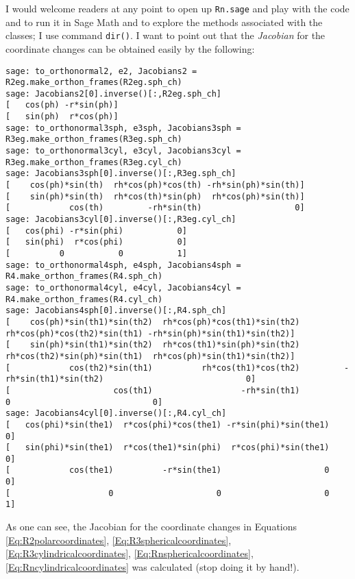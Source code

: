 \documentclass[10pt, twoside]{amsart}
\begin{document}
\begin{multicols*}{2}
I would welcome readers at any point to open up \verb|Rn.sage| and play with the code and to run it in Sage Math and to explore the methods associated with the classes; I use command \verb|dir()|.  I want to point out that the \emph{Jacobian} for the coordinate changes can be obtained easily by the following:
\begin{lstlisting}
sage: to_orthonormal2, e2, Jacobians2 = R2eg.make_orthon_frames(R2eg.sph_ch)
sage: Jacobians2[0].inverse()[:,R2eg.sph_ch]
[   cos(ph) -r*sin(ph)]
[   sin(ph)  r*cos(ph)]
sage: to_orthonormal3sph, e3sph, Jacobians3sph = R3eg.make_orthon_frames(R3eg.sph_ch)
sage: to_orthonormal3cyl, e3cyl, Jacobians3cyl = R3eg.make_orthon_frames(R3eg.cyl_ch)
sage: Jacobians3sph[0].inverse()[:,R3eg.sph_ch]
[    cos(ph)*sin(th)  rh*cos(ph)*cos(th) -rh*sin(ph)*sin(th)]
[    sin(ph)*sin(th)  rh*cos(th)*sin(ph)  rh*cos(ph)*sin(th)]
[            cos(th)         -rh*sin(th)                   0]
sage: Jacobians3cyl[0].inverse()[:,R3eg.cyl_ch]
[   cos(phi) -r*sin(phi)           0]
[   sin(phi)  r*cos(phi)           0]
[          0           0           1]
sage: to_orthonormal4sph, e4sph, Jacobians4sph = R4.make_orthon_frames(R4.sph_ch)
sage: to_orthonormal4cyl, e4cyl, Jacobians4cyl = R4.make_orthon_frames(R4.cyl_ch)
sage: Jacobians4sph[0].inverse()[:,R4.sph_ch]
[    cos(ph)*sin(th1)*sin(th2)  rh*cos(ph)*cos(th1)*sin(th2)  rh*cos(ph)*cos(th2)*sin(th1) -rh*sin(ph)*sin(th1)*sin(th2)]
[    sin(ph)*sin(th1)*sin(th2)  rh*cos(th1)*sin(ph)*sin(th2)  rh*cos(th2)*sin(ph)*sin(th1)  rh*cos(ph)*sin(th1)*sin(th2)]
[            cos(th2)*sin(th1)          rh*cos(th1)*cos(th2)         -rh*sin(th1)*sin(th2)                             0]
[                     cos(th1)                  -rh*sin(th1)                             0                             0]
sage: Jacobians4cyl[0].inverse()[:,R4.cyl_ch]
[   cos(phi)*sin(the1)  r*cos(phi)*cos(the1) -r*sin(phi)*sin(the1)                     0]
[   sin(phi)*sin(the1)  r*cos(the1)*sin(phi)  r*cos(phi)*sin(the1)                     0]
[            cos(the1)          -r*sin(the1)                     0                     0]
[                    0                     0                     0                     1]
\end{lstlisting}
As one can see, the Jacobian for the coordinate changes in Equations \ref{Eq:R2polarcoordinates}, \ref{Eq:R3sphericalcoordinates}, \ref{Eq:R3cylindricalcoordinates}, \ref{Eq:Rnsphericalcoordinates}, \ref{Eq:Rncylindricalcoordinates} was calculated (stop doing it by hand!).  





\end{multicols*}
\end{document}
